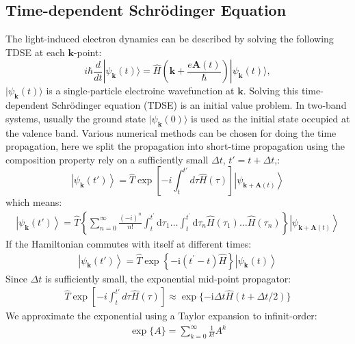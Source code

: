 \subsection{Time-dependent Schr\"odinger Equation}
The light-induced electron dynamics can be described by solving the following \gls {TDSE} at each $\mathbf k$-point:
\begin{equation}
	i\hbar \frac{d}{dt}| \psi_{\mathbf {k}}(t) \rangle = \hat{H}\left ( \mathbf k + \frac{e\mathbf A(t)}{\hbar} \right )| \psi_{\mathbf k}(t) \rangle,
	\label{eqn:TDSE}
\end{equation}
$|\psi_{\mathbf k}(t)\rangle$ is a single-particle electroinc wavefunction at $\mathbf k$.
Solving this time-dependent Schr\"odinger equation (\gls {TDSE}) is an initial value problem. In
two-band systems, usually the ground state $|\psi_{\mathbf k}(0)\rangle$ is used as the initial state
occupied at the valence band.
Various numerical methods can be chosen for doing the time propagation, here we split the propagation into short-time propagation using the composition property rely on a sufficiently small $\Delta t$, $t'=t+\Delta t$,:
\begin{equation}
	\left|\psi_{\mathbf{k}}(t')\right\rangle=\hat{T}\exp \left[-i \int_{t}^{t'} d \tau \hat{H}(\tau) \right]\left|\psi_{\mathbf{k}+\mathbf{A}(t)}\right\rangle
	\label{eqn:deltat}
\end{equation}
which means:
\begin{align}
	\left|\psi_{\mathbf{k}}(t')\right\rangle=\hat{T} \left\{\sum_{n=0}^{\infty} \frac{(-i)^n}{n !} \int_t^{t^{\prime}} \mathrm{d} \tau_1 \ldots \int_t^{t^{\prime}} \mathrm{d} \tau_n \hat{H}\left(\tau_1\right) \ldots \hat{H}\left(\tau_n\right)\right\} \left|\psi_{\mathbf{k}+\mathbf{A}(t)}\right\rangle
\end{align}
If the Hamiltonian commutes with itself at different times:
\begin{align}
	\left|\psi_{\mathbf{k}}(t')\right\rangle=\hat{T}\exp \left\{-\mathrm{i}\left(t^{\prime}-t\right) \hat{H}\right\} \left|\psi_{\mathbf{k}}(t)\right\rangle
\end{align}
Since $\Delta t$ is sufficiently small, the exponential mid-point propagator:
\begin{align}
	\hat{T}	\exp \left[-i \int_{t}^{t'} d \tau \hat{H}(\tau) \right] \approx \exp \{-\mathrm{i} \Delta t \hat{H}(t+\Delta t / 2)\}
\end{align}
We approximate the exponential using a Taylor expansion to infinit-order:
\begin{align}
	\exp \{A\}=\sum_{k=0}^{\infty} \frac{1}{k!} A^k
\end{align}
